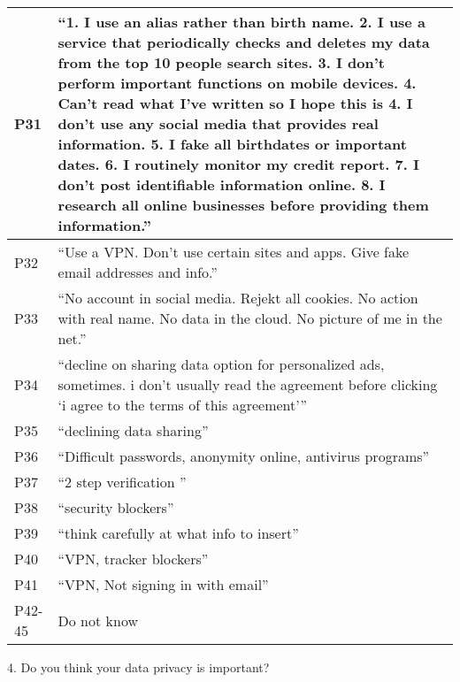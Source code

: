 \begin{longtable}{p{3cm} p{13cm}}
    \hline
    P31 & ``1. I use an alias rather than birth name. 2. I use a service that periodically checks and deletes my data from the top 10 people search sites. 3. I don't perform important functions on mobile devices. 4. Can't read what I've written so I hope this is 4. I don't use any social media that provides real information. 5. I fake all birthdates or important dates. 6. I routinely monitor my credit report. 7. I don't post identifiable information online. 8. I research all online businesses before providing them information.'' \\
    \hline
    P32 & ``Use a VPN. Don't use certain sites and apps. Give fake email addresses and info.'' \\
    \hline
    P33 & ``No account in social media. Rejekt all cookies. No action with real name. No data in the cloud. No picture of me in the net.'' \\
    \hline
    P34 & ``decline on sharing data option for personalized ads, sometimes. i don't usually read the agreement before clicking `i agree to the terms of this agreement''' \\
    \hline
    P35 & ``declining data sharing'' \\
    \hline
    P36 & ``Difficult passwords, anonymity online, antivirus programs'' \\
    \hline
    P37 & ``2 step verification '' \\
    \hline
    P38 & ``security blockers'' \\
    \hline
    P39 & ``think carefully at what info to insert'' \\
    \hline
    P40 & ``VPN, tracker blockers'' \\
    \hline
    P41 & ``VPN, Not signing in with email'' \\
    \hline
    P42-45 & Do not know \\
    \hline
\end{longtable}

\clearpage

4. Do you think your data privacy is important?

